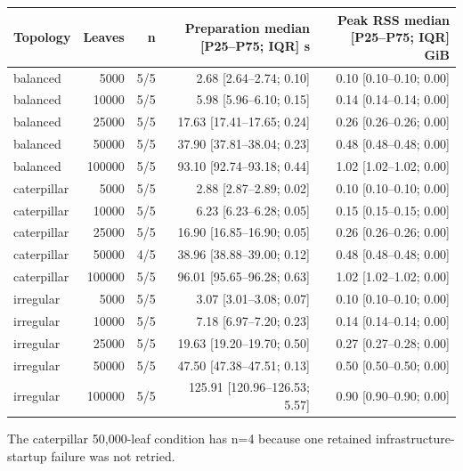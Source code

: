 \begin{tabular}{lrrrr}
\hline
Topology & Leaves & n & Preparation median [P25--P75; IQR] s & Peak RSS median [P25--P75; IQR] GiB \\
\hline
balanced & 5000 & 5/5 & 2.68 [2.64--2.74; 0.10] & 0.10 [0.10--0.10; 0.00] \\
balanced & 10000 & 5/5 & 5.98 [5.96--6.10; 0.15] & 0.14 [0.14--0.14; 0.00] \\
balanced & 25000 & 5/5 & 17.63 [17.41--17.65; 0.24] & 0.26 [0.26--0.26; 0.00] \\
balanced & 50000 & 5/5 & 37.90 [37.81--38.04; 0.23] & 0.48 [0.48--0.48; 0.00] \\
balanced & 100000 & 5/5 & 93.10 [92.74--93.18; 0.44] & 1.02 [1.02--1.02; 0.00] \\
caterpillar & 5000 & 5/5 & 2.88 [2.87--2.89; 0.02] & 0.10 [0.10--0.10; 0.00] \\
caterpillar & 10000 & 5/5 & 6.23 [6.23--6.28; 0.05] & 0.15 [0.15--0.15; 0.00] \\
caterpillar & 25000 & 5/5 & 16.90 [16.85--16.90; 0.05] & 0.26 [0.26--0.26; 0.00] \\
caterpillar & 50000 & 4/5 & 38.96 [38.88--39.00; 0.12] & 0.48 [0.48--0.48; 0.00] \\
caterpillar & 100000 & 5/5 & 96.01 [95.65--96.28; 0.63] & 1.02 [1.02--1.02; 0.00] \\
irregular & 5000 & 5/5 & 3.07 [3.01--3.08; 0.07] & 0.10 [0.10--0.10; 0.00] \\
irregular & 10000 & 5/5 & 7.18 [6.97--7.20; 0.23] & 0.14 [0.14--0.14; 0.00] \\
irregular & 25000 & 5/5 & 19.63 [19.20--19.70; 0.50] & 0.27 [0.27--0.28; 0.00] \\
irregular & 50000 & 5/5 & 47.50 [47.38--47.51; 0.13] & 0.50 [0.50--0.50; 0.00] \\
irregular & 100000 & 5/5 & 125.91 [120.96--126.53; 5.57] & 0.90 [0.90--0.90; 0.00] \\
\hline
\end{tabular}

\par\smallskip
\footnotesize The caterpillar 50,000-leaf condition has n=4 because one retained infrastructure-startup failure was not retried.

